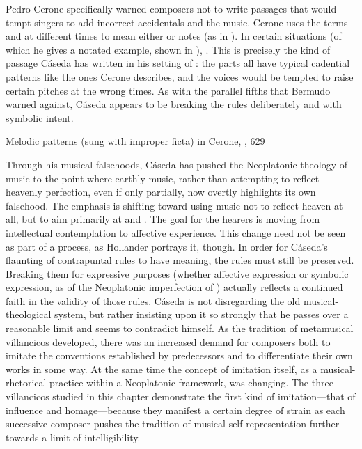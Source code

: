 Pedro Cerone specifically warned composers not to write passages that would
tempt singers to add incorrect accidentals and  the music.
Cerone uses the terms  and  at different
times to mean either  or  notes (as in
).
In certain situations (of which he gives a notated example, shown in
), .%
    \Autocite[629]{Cerone:Melopeo}
This is precisely the kind of passage Cáseda has written in his setting of
: the parts all have typical cadential patterns like
the ones Cerone describes, and the voices would be tempted to raise certain
pitches at the wrong times. 
As with the parallel fifths that Bermudo warned against, Cáseda appears to be
breaking the rules deliberately and with symbolic intent.


{Melodic patterns  (sung with improper
ficta) in Cerone, , 629} 

Through his musical falsehoods, Cáseda has pushed the Neoplatonic theology of
music to the point where earthly music, rather than attempting to reflect
heavenly perfection, even if only partially, now overtly highlights its own
falsehood.
The emphasis is shifting toward using music not to reflect heaven at all, but
to aim primarily at  and .
The goal for the hearers is moving from intellectual contemplation to affective
experience.
This change need not be seen as part of a  process, as
Hollander portrays it, though.
In order for Cáseda's flaunting of contrapuntal rules to have meaning, the
rules must still be preserved.
Breaking them for expressive purposes (whether affective expression or symbolic
expression, as of the Neoplatonic imperfection of ) actually reflects a continued faith in the validity of those
rules.
Cáseda is not disregarding the old musical-theological system, but rather
insisting upon it so strongly that he passes over a reasonable limit and seems
to contradict himself.
As the tradition of metamusical villancicos developed, there was an increased
demand for composers both to imitate the conventions established by
predecessors and to differentiate their own works in some way. 
At the same time the concept of imitation itself, as a musical-rhetorical
practice within a Neoplatonic framework, was changing.
The three villancicos studied in this chapter demonstrate the first kind of
imitation---that of influence and homage---because they manifest a certain
degree of strain as each successive composer pushes the tradition of musical
self-representation further towards a limit of intelligibility.

